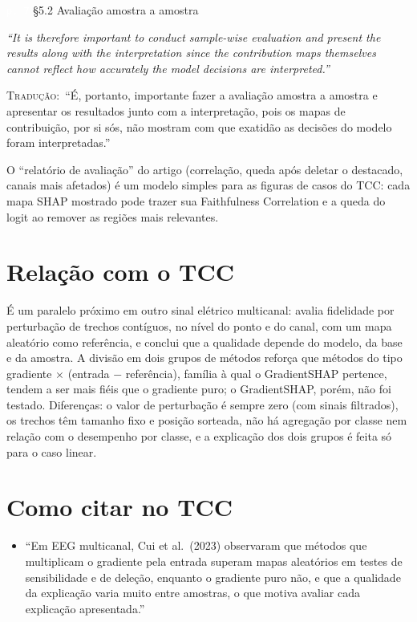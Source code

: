 \documentclass[11pt,a4paper]{article}
\newcommand{\pagechip}[1]{{\setlength{\fboxsep}{1.5pt}\colorbox{cAcc}{\textcolor{white}{\scriptsize\texttt{#1}}}}}
\newenvironment{origquote}{\par\itshape\small}{\par}
\newenvironment{tradquote}{\par\small\textsc{Tradução:}\ }{\par}
\newcommand{\explab}[1]{\par\smallskip{\small\color{cAcc}\textbf{\MakeUppercase{#1}}}\par}
\begin{document}
\begin{citacard}{\pagechip{p. 7} §5.2 Avaliação amostra a amostra}
\begin{origquote}“It is therefore important to conduct sample-wise evaluation and present the results along with the interpretation since the contribution maps themselves cannot reflect how accurately the model decisions are interpreted.”\end{origquote}
\begin{tradquote}“É, portanto, importante fazer a avaliação amostra a amostra e apresentar os resultados junto com a interpretação, pois os mapas de contribuição, por si sós, não mostram com que exatidão as decisões do modelo foram interpretadas.”\end{tradquote}
\explab{Explicação}
O ``relatório de avaliação'' do artigo (correlação, queda após deletar o destacado, canais mais afetados) é um modelo simples para as figuras de casos do TCC: cada mapa SHAP mostrado pode trazer sua Faithfulness Correlation e a queda do logit ao remover as regiões mais relevantes.
\end{citacard}

\section{Relação com o TCC}
É um paralelo próximo em outro sinal elétrico multicanal: avalia fidelidade por perturbação de trechos contíguos, no nível do ponto e do canal, com um mapa aleatório como referência, e conclui que a qualidade depende do modelo, da base e da amostra. A divisão em dois grupos de métodos reforça que métodos do tipo gradiente $\times$ (entrada $-$ referência), família à qual o GradientSHAP pertence, tendem a ser mais fiéis que o gradiente puro; o GradientSHAP, porém, não foi testado. Diferenças: o valor de perturbação é sempre zero (com sinais filtrados), os trechos têm tamanho fixo e posição sorteada, não há agregação por classe nem relação com o desempenho por classe, e a explicação dos dois grupos é feita só para o caso linear.

\section{Como citar no TCC}
\begin{itemize}
\item ``Em EEG multicanal, Cui et al.\ (2023) observaram que métodos que multiplicam o gradiente pela entrada superam mapas aleatórios em testes de sensibilidade e de deleção, enquanto o gradiente puro não, e que a qualidade da explicação varia muito entre amostras, o que motiva avaliar cada explicação apresentada.''
\end{itemize}
\end{document}
